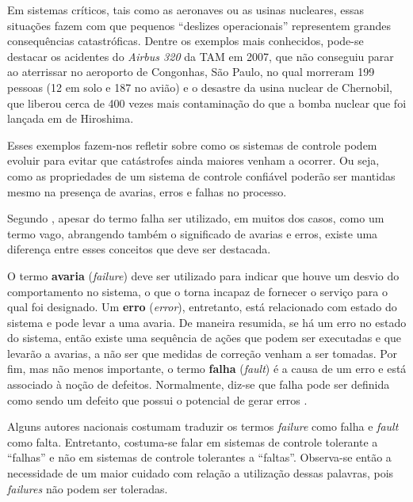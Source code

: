Em sistemas críticos, tais como as aeronaves ou as usinas nucleares, essas
situações fazem com que pequenos ``deslizes operacionais'' representem grandes
consequências catastróficas. Dentre os exemplos mais conhecidos, pode-se
destacar os acidentes do {\it Airbus 320} da TAM em 2007, que não conseguiu
parar ao aterrissar no aeroporto de Congonhas, São Paulo, no qual morreram 199
pessoas (12 em solo e 187 no avião) e o desastre da usina nuclear de Chernobil,
que liberou cerca de 400 vezes mais contaminação do que a bomba nuclear que foi
lançada em de Hiroshima.

Esses exemplos fazem-nos refletir sobre como os sistemas de controle podem
evoluir para evitar que catástrofes ainda maiores venham a ocorrer. Ou seja,
como as propriedades de um sistema de controle confiável poderão ser mantidas
mesmo na presença de avarias, erros e falhas no processo.

Segundo , apesar do termo falha ser utilizado, em muitos
dos casos, como um termo vago, abrangendo também o significado de avarias e
erros, existe uma diferença entre esses conceitos que deve ser destacada.

O termo {\bf avaria} ({\it failure}) deve ser utilizado para indicar que houve
um desvio do comportamento no sistema, o que o torna incapaz de fornecer o
serviço para o qual foi designado. Um {\bf erro} ({\it error}), entretanto, está
relacionado com estado do sistema e pode levar a uma avaria. De maneira
resumida, se há um erro no estado do sistema, então existe uma sequência de
ações que podem ser executadas e que levarão a avarias, a não ser que medidas de
correção venham a ser tomadas. Por fim, mas não menos importante, o termo {\bf
falha} ({\it fault}) é a causa de um erro e está associado à noção de defeitos.
Normalmente, diz-se que falha pode ser definida como sendo um defeito que possui
o potencial de gerar erros \cite{nelio:2002,weber:2002}.

Alguns autores nacionais costumam traduzir os termos {\it failure} como falha e
{\it fault} como falta. Entretanto, costuma-se falar em sistemas de controle
tolerante a ``falhas'' e não em sistemas de controle tolerantes a ``faltas''.
Observa-se então a necessidade de um maior cuidado com relação a utilização
dessas palavras, pois {\it failures} não podem ser toleradas.

\begin{comment}
Por esse motivo, ao longo do texto, quando for necessário se referir ao termo
{\it failure}, será utilizada a palavra avaria. Já o termo falha será utilizado
de maneira mais abrangente, envolvendo os conceitos de erro e de falha
explicados anteriormente.
\end{comment}

